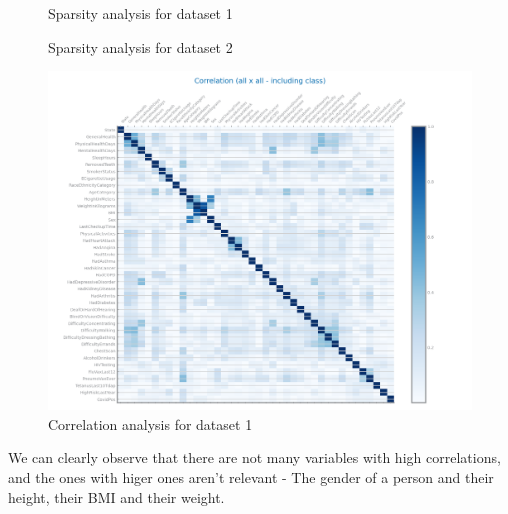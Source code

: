 \documentclass[10pt]{extarticle}
\begin{document}
\begin{figure}[H]
\caption{Sparsity analysis for dataset 1}
\end{figure}

\begin{figure}[H]
\caption{Sparsity analysis for dataset 2}
\end{figure}

\begin{figure}[H]
\centering\includegraphics[scale=0.6]{images/dataset1/data_profiling/CovidPos_correlation_analysis.png}
\caption{Correlation analysis for dataset 1}
\end{figure}
We can clearly observe that there are not many variables with high correlations, and the ones with higer ones aren't relevant -
The gender of a person and their height, their BMI and their weight.
\end{document}
